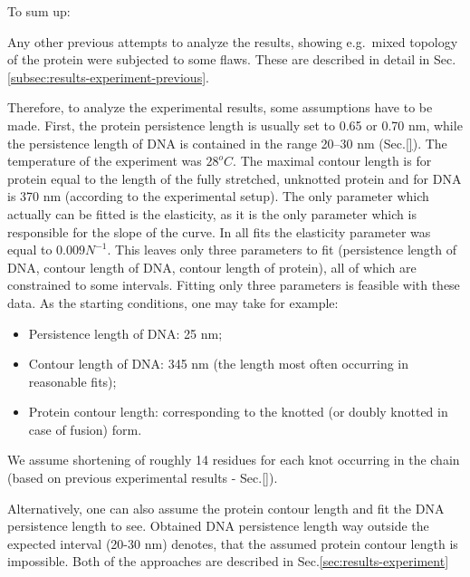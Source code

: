 To sum up:

Any other previous attempts to analyze the results, showing e.g.\ mixed topology of the protein were subjected to some flaws.
These are described in detail in Sec.\ref{subsec:results-experiment-previous}.

Therefore, to analyze the experimental results, some assumptions have to be made.
First, the protein persistence length is usually set to 0.65 or 0.70 nm, while the persistence length of DNA is contained in the range 20--30 nm (Sec.\ref{}).
The temperature of the experiment was $28^{o}C$.
The maximal contour length is for protein equal to the length of the fully stretched, unknotted protein and for DNA is 370 nm (according to the experimental setup).
The only parameter which actually can be fitted is the elasticity, as it is the only parameter which is responsible for the slope of the curve.
In all fits the elasticity parameter was equal to $0.009 N^{-1}$.
This leaves only three parameters to fit (persistence length of DNA, contour length of DNA, contour length of protein), all of which are constrained to some intervals.
Fitting only three parameters is feasible with these data.
As the starting conditions, one may take for example:
\begin{itemize}
    \item Persistence length of DNA: 25 nm;
    \item Contour length of DNA: 345 nm (the length most often occurring in reasonable fits);
    \item Protein contour length: corresponding to the knotted (or doubly knotted in case of fusion) form.
\end{itemize}
We assume shortening of roughly 14 residues for each knot occurring in the chain (based on previous experimental results - Sec.\ref{}).

Alternatively, one can also assume the protein contour length and fit the DNA persistence length to see.
Obtained DNA persistence length way outside the expected interval (20-30 nm) denotes, that the assumed protein contour length is impossible.
Both of the approaches are described in Sec.\ref{sec:results-experiment}

